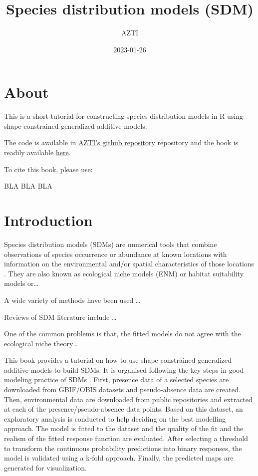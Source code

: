 \documentclass[
]{book}
\title{Species distribution models (SDM)}
\author{AZTI}
\date{2023-01-26}
\begin{document}
\maketitle

{
\setcounter{tocdepth}{1}
\tableofcontents
}
\hypertarget{about}{%
\chapter*{About}\label{about}}

This is a short tutorial for constructing species distribution models in R using shape-constrained generalized additive models.

The code is available in \href{https://github.com/Fundacion-AZTI/SDM}{AZTI's github repository} repository and the book is readily available \href{https://fundacion-azti.github.io/SDM/}{here}.

To cite this book, please use:

BLA BLA BLA

\hypertarget{introduction}{%
\chapter{Introduction}\label{introduction}}

Species distribution models (SDMs) are numerical tools that combine observations of species occurrence or abundance at known locations with information on the environmental and/or spatial characteristics of those locations \citep{elith_etal_2009}. They are also known as ecological niche models (ENM) or habitat suitability models or\ldots{}

A wide variety of methods have been used \ldots{}

Reviews of SDM literature include \ldots{}

One of the common problems is that, the fitted models do not agree with the ecological niche theory\ldots{}

This book provides a tutorial on how to use shape-constrained generalized additive models to build SDMs. It is organised following the key steps in good modeling practice of SDMs \citep{elith_etal_2009}. First, presence data of a selected species are downloaded from GBIF/OBIS datasets and pseudo-absence data are created. Then, environmental data are downloaded from public repositories and extracted at each of the presence/pseudo-absence data points. Based on this dataset, an exploratory analysis is conducted to help deciding on the best modelling approach. The model is fitted to the dataset and the quality of the fit and the realism of the fitted response function are evaluated. After selecting a threshold to transform the continuous probability predictions into binary responses, the model is validated using a k-fold approach. Finally, the predicted maps are generated for visualization.
\end{document}
